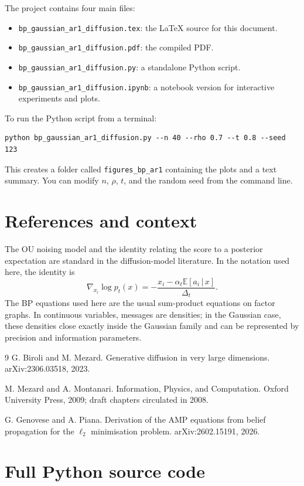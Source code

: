 \documentclass[11pt]{article}
\newcommand{\E}{\mathbb{E}}
\newcommand{\given}{\,|\,}
\begin{document}
The project contains four main files:
\begin{itemize}
  \item \texttt{bp\_gaussian\_ar1\_diffusion.tex}: the LaTeX source for this document.
  \item \texttt{bp\_gaussian\_ar1\_diffusion.pdf}: the compiled PDF.
  \item \texttt{bp\_gaussian\_ar1\_diffusion.py}: a standalone Python script.
  \item \texttt{bp\_gaussian\_ar1\_diffusion.ipynb}: a notebook version for interactive experiments and plots.
\end{itemize}
To run the Python script from a terminal:
\begin{verbatim}
python bp_gaussian_ar1_diffusion.py --n 40 --rho 0.7 --t 0.8 --seed 123
\end{verbatim}
This creates a folder called \texttt{figures\_bp\_ar1} containing the plots and a text summary. You can modify \(n\), \(\rho\), \(t\), and the random seed from the command line.

\section{References and context}

The OU noising model and the identity relating the score to a posterior expectation are standard in the diffusion-model literature. In the notation used here, the identity is
\[
  \nabla_{x_i}\log p_t(x)
  =-\frac{x_i-\alpha_t\E[a_i\given x]}{\Delta_t}.
\]
The BP equations used here are the usual sum-product equations on factor graphs. In continuous variables, messages are densities; in the Gaussian case, these densities close exactly inside the Gaussian family and can be represented by precision and information parameters.

\begin{thebibliography}{9}
G. Biroli and M. Mezard.
\newblock Generative diffusion in very large dimensions.
\newblock arXiv:2306.03518, 2023.

M. Mezard and A. Montanari.
\newblock Information, Physics, and Computation.
\newblock Oxford University Press, 2009; draft chapters circulated in 2008.

G. Genovese and A. Piana.
\newblock Derivation of the AMP equations from belief propagation for the \(\ell_2\) minimisation problem.
\newblock arXiv:2602.15191, 2026.
\end{thebibliography}

\appendix
\clearpage
\section{Full Python source code}


\end{document}
